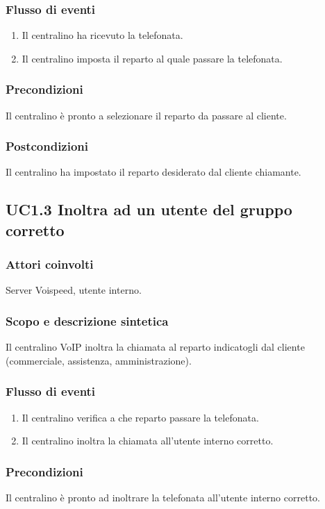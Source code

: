 \subsubsection*{Flusso di eventi}
\begin{enumerate}
\item Il centralino ha ricevuto la telefonata.
\item Il centralino imposta il reparto al quale passare la telefonata.
\end{enumerate}
\subsubsection*{Precondizioni} Il centralino \` e pronto a selezionare il reparto da passare al cliente.
\subsubsection*{Postcondizioni} Il centralino ha impostato il reparto desiderato dal cliente chiamante.

\subsection*{UC1.3 Inoltra ad un utente del gruppo corretto}
\subsubsection*{Attori coinvolti} Server Voispeed, utente interno.
\subsubsection*{Scopo e descrizione sintetica}
Il centralino VoIP  inoltra la chiamata al reparto indicatogli dal cliente (commerciale, assistenza, amministrazione).
\subsubsection*{Flusso di eventi}
\begin{enumerate}
\item Il centralino verifica a che reparto passare la telefonata.
\item Il centralino inoltra la chiamata all'utente interno corretto.
\end{enumerate}
\subsubsection*{Precondizioni} Il centralino \` e pronto ad inoltrare la telefonata all'utente interno corretto.
